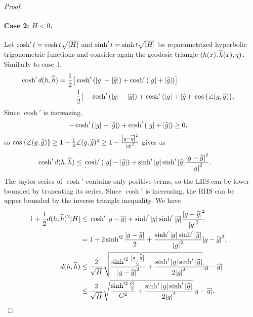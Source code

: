 \documentclass[english, a4paper, 12pt]{article}
\begin{document}
\begin{proof}
	\paragraph{Case 2: $H < 0$.}
	Let $\cosh'{t} = \cosh{t \sqrt{\abs{H}}}$ and $\sinh'{t} = \sinh{t \sqrt{\abs{H}}}$ be reparametrized hyperbolic trigonometric functions and consider again the geodesic triangle $(h(x), \widehat{h}(x), q)$.
	Similarly to case 1,
	\begin{align}
		\cosh'{d(h, \mathhat{h})} ={}& \frac{1}{2} \big[
			\cosh'{(\abs{g} - \abs{\mathhat{g}})}
			+ \cosh'{(\abs{g} + \abs{\mathhat{g}})}
		\big]\\
		&- \frac{1}{2} \big[
			-\cosh'{(\abs{g} - \abs{\mathhat{g}})}
			+ \cosh'{(\abs{g} + \abs{\mathhat{g}})}
		\big] \cos{\left\{ \angle(g, \mathhat{g}) \right\}}.%
		\label{eq:exact_expression_for_cosh_of_rhs}
	\end{align}
	Since $\cosh'{}$ is increasing,
	\begin{align}
		-\cosh'{(\abs{g} - \abs{\widehat{g}})} + \cosh'{(\abs{g} + \abs{\widehat{g}})} \geq 0,
	\end{align}
	so $\cos{\left\{ \angle(g, \widehat{g}) \right\}} \geq 1 - \frac{1}{2} \angle(g, \widehat{g})^2 \geq 1 - \frac{\abs{g - \widehat{g}}^2}{\abs{g}^2}$  gives us
	\begin{align}
		\cosh'{d(h, \widehat{h})} \leq{}& \cosh'{(\abs{g} - \abs{\widehat{g}})} + \sinh'{\abs{g}} \sinh'{\abs{\widehat{g}}} \frac{\abs{g - \widehat{g}}^2}{\abs{g}^2}.
	\end{align}
	The taylor series of $\cosh'{}$ contains only positive terms, so the LHS can be lower bounded by truncating its series.
	Since $\cosh'{}$ is increasing, the RHS can be upper bounded by the inverse triangle inequality.
	We have
	\begin{align}
	1 + \frac{1}{2} d(h, \widehat{h})^2 \abs{H} \leq{}&
		\cosh'{\abs{g - \widehat{g}}}
		+ \sinh'{\abs{g}} \sinh'{\abs{\widehat{g}}} \frac{\abs{g - \widehat{g}}^2}{\abs{g}^2}\\
	={}& 1 + 2 \sinh'^2{\frac{\abs{g - \widehat{g}}}{2}} + \frac{\sinh'{\abs{g}} \sinh'{\abs{\widehat{g}}}}{\abs{g}^2} \abs{g - \widehat{g}}^2,\\
	d(h, \widehat{h})
	\leq{}& \frac{2}{\sqrt{H}} \sqrt{
		\frac{\sinh'^2{\frac{\abs{g - \widehat{g}}}{2}}}{\abs{g - \widehat{g}}^2}
		+ \frac{\sinh'{\abs{g}} \sinh'{\abs{\widehat{g}}}}{2 \abs{g}^2}
		} \abs{g - \widehat{g}}\\
	\leq{}& \frac{2}{\sqrt{H}} \sqrt{
		\frac{\sinh'^2{\frac{G}{2}}}{G^2}
		+ \frac{\sinh'{\abs{g}} \sinh'{\abs{\widehat{g}}}}{2 \abs{g}^2}
		} \abs{g - \widehat{g}}.
	\end{align}
\end{proof}
\end{document}
